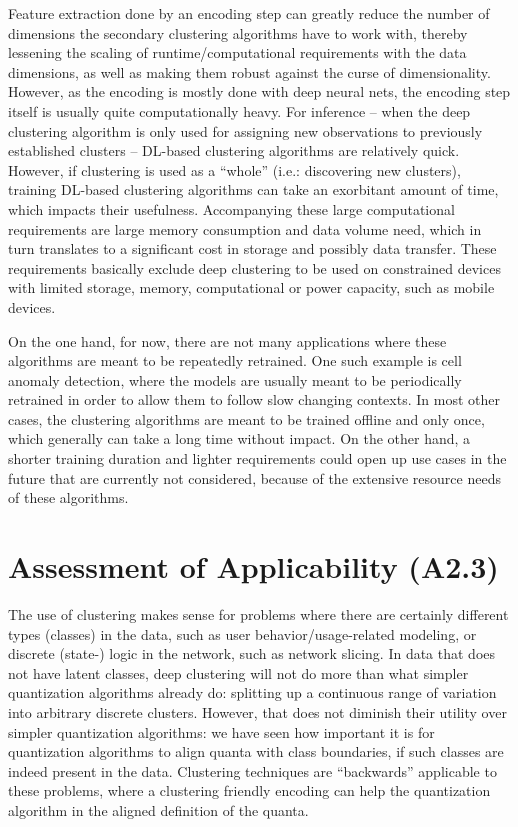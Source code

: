 		Feature extraction done by an encoding step can greatly reduce the number of dimensions the secondary clustering algorithms have to work with, thereby lessening the scaling of runtime/computational requirements with the data dimensions, as well as making them robust against the curse of dimensionality.
		However, as the encoding is mostly done with deep neural nets, the encoding step itself is usually quite computationally heavy.
		For inference -- when the deep clustering algorithm is only used for assigning new observations to previously established clusters -- \ac{DL}-based clustering algorithms are relatively quick.
		However, if clustering is used as a ``whole'' (i.e.: discovering new clusters), training \ac{DL}-based clustering algorithms can take an exorbitant amount of time, which impacts their usefulness.
		Accompanying these large computational requirements are large memory consumption and data volume need, which in turn translates to a significant cost in storage and possibly data transfer.
		These requirements basically exclude deep clustering to be used on constrained devices with limited storage, memory, computational or power capacity, such as mobile devices.
		
		On the one hand, for now, there are not many applications where these algorithms are meant to be repeatedly retrained.
		One such example is cell anomaly detection, where the models are usually meant to be periodically retrained in order to allow them to follow slow changing contexts.
		In most other cases, the clustering algorithms are meant to be trained offline and only once, which generally can take a long time without impact.
		On the other hand, a shorter training duration and lighter requirements could open up use cases in the future that are currently not considered, because of the extensive resource needs of these algorithms.
				
	\section{Assessment of Applicability (A2.3)}
	
		The use of clustering makes sense for problems where there are certainly different types (classes) in the data, such as user behavior/usage-related modeling, or discrete (state-) logic in the network, such as network slicing.
		In data that does not have latent classes, deep clustering will not do more than what simpler quantization algorithms already do: splitting up a continuous range of variation into arbitrary discrete clusters.
		However, that does not diminish their utility over simpler quantization algorithms: we have seen how important it is for quantization algorithms to align quanta with class boundaries, if such classes are indeed present in the data.	
		Clustering techniques are ``backwards'' applicable to these problems, where a clustering friendly encoding can help the quantization algorithm in the aligned definition of the quanta.
		
